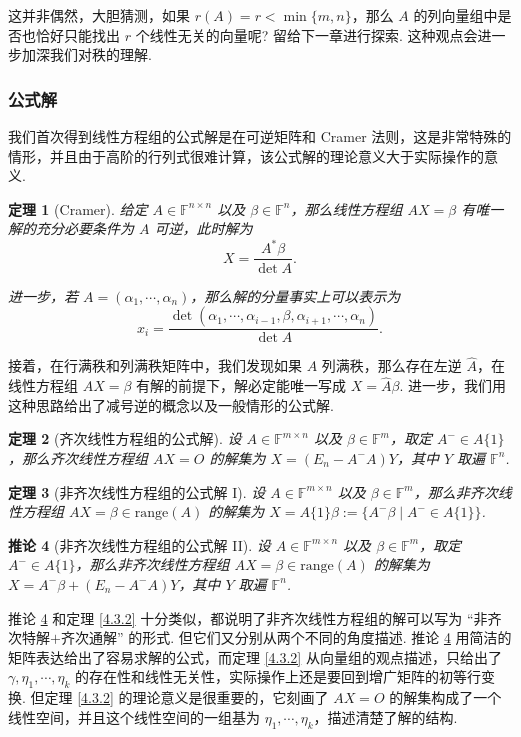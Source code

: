 \documentclass[10pt,openany]{article}
\theoremstyle{thmstyle} %
\newtheorem{theorem}{定理}[subsection]
\theoremstyle{defstyle} %
\newtheorem{corollary}[theorem]{推论}
\theoremstyle{prostyle} %
\theoremstyle{exastyle}
\theoremstyle{remstyle}
\newcommand{\F}{\mathbb{F}}
\newcommand{\n}{^{n \times n}}
\newcommand{\mn}{^{m \times n}}
\begin{document}
这并非偶然，大胆猜测，如果 \( r(A)=r<\min\{m,n\} \)，那么 \( A \) 的列向量组中是否也恰好只能找出 \( r \) 个线性无关的向量呢? 留给下一章进行探索. 这种观点会进一步加深我们对秩的理解.
 
\subsubsection{公式解}

我们首次得到线性方程组的公式解是在可逆矩阵和 Cramer 法则，这是非常特殊的情形，并且由于高阶的行列式很难计算，该公式解的理论意义大于实际操作的意义.

\begin{theorem}[Cramer]
	给定 \( A \in \F\n \) 以及 \( \beta \in \F^n \)，那么线性方程组 \( AX=\beta \) 有唯一解的充分必要条件为 \( A \) 可逆，此时解为
	\[ X=\frac{A^*\beta}{\det A}. \]
	
	进一步，若 \( A=(\alpha_1,\cdots,\alpha_n) \)，那么解的分量事实上可以表示为
	\[ x_i=\frac{\det(\alpha_1,\cdots,\alpha_{i-1},\beta,\alpha_{i+1},\cdots,\alpha_n)}{\det A}. \]
	
\end{theorem}


接着，在行满秩和列满秩矩阵中，我们发现如果 \( A \) 列满秩，那么存在左逆 \( \hat{A} \)，在线性方程组 \( AX=\beta \) 有解的前提下，解必定能唯一写成 \( X=\hat{A}\beta \). 进一步，我们用这种思路给出了减号逆的概念以及一般情形的公式解.


\begin{theorem}[齐次线性方程组的公式解] 
	设 \( A \in \F\mn \) 以及 \( \beta \in \F^m \)，取定 \( A^{-} \in A\{1\} \)，那么齐次线性方程组 \( AX=O \) 的解集为 \( X=(E_n-A^{-}A)Y \)，其中 \( Y \) 取遍 \( \F^n \). 
\end{theorem}

\begin{theorem}[非齐次线性方程组的公式解 I]
	设 \( A \in \F\mn \) 以及 \( \beta \in \F^m \)，那么非齐次线性方程组 \( AX=\beta \in \text{range}(A) \) 的解集为 \( X=A\{1\}\beta:=\{A^{-}\beta\mid A^{-} \in A\{1\}\} \). 
\end{theorem}

\begin{corollary}[非齐次线性方程组的公式解 II] \label{4.3.8}
	设 \( A \in \F\mn \) 以及 \( \beta \in \F^m \)，取定 \( A^{-} \in A\{1\} \)，那么非齐次线性方程组 \( AX=\beta \in \text{range}(A) \) 的解集为 \( X=A^{-}\beta+(E_n-A^{-}A)Y \)，其中 \( Y \) 取遍 \( \F^n \). 
\end{corollary}


推论 \ref{4.3.8} 和定理 \ref{4.3.2} 十分类似，都说明了非齐次线性方程组的解可以写为 “非齐次特解\(+\)齐次通解” 的形式. 但它们又分别从两个不同的角度描述. 推论 \ref{4.3.8} 用简洁的矩阵表达给出了容易求解的公式，而定理 \ref{4.3.2} 从向量组的观点描述，只给出了 \( \gamma,\eta_1,\cdots,\eta_k \) 的存在性和线性无关性，实际操作上还是要回到增广矩阵的初等行变换. 但定理 \ref{4.3.2} 的理论意义是很重要的，它刻画了 \( AX=O \) 的解集构成了一个线性空间，并且这个线性空间的一组基为 \( \eta_1,\cdots,\eta_k \)，描述清楚了解的结构.
\end{document}
